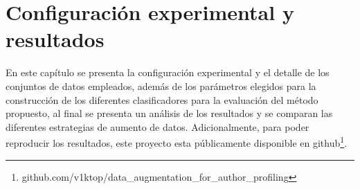 \chapter{Configuración experimental y resultados}
En este capítulo se presenta la configuración experimental y el detalle de los conjuntos de datos empleados, además de los parámetros elegidos para la construcción de los diferentes clasificadores para la evaluación del método propuesto, al final se presenta un análisis de los resultados y se comparan las diferentes estrategias de aumento de datos. Adicionalmente, para poder reproducir los resultados, este proyecto esta públicamente disponible en github\footnote{github.com/v1ktop/data\_augmentation\_for\_author\_profiling}.








